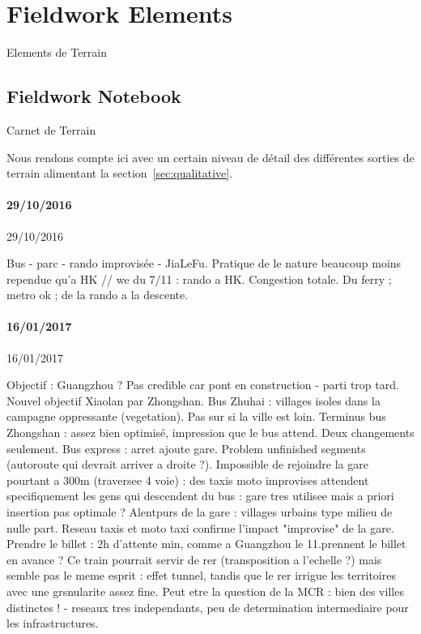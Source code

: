 




\section{Fieldwork Elements}{Elements de Terrain}

\label{app:sec:qualitative}


\subsection{Fieldwork Notebook}{Carnet de Terrain}

Nous rendons compte ici avec un certain niveau de détail des différentes sorties de terrain alimentant la section~\ref{sec:qualitative}.




\paragraph{29/10/2016}{29/10/2016}

Bus - parc - rando improvisée - JiaLeFu.
Pratique de le nature beaucoup moins rependue qu'a HK
// we du 7/11 : rando a HK. Congestion totale. Du ferry ; metro ok ; de la rando a la descente.



\paragraph{16/01/2017}{16/01/2017}

Objectif : Guangzhou ? Pas credible car pont en construction - parti trop tard. Nouvel objectif Xiaolan par Zhongshan. Bus Zhuhai : villages isoles dans la campagne oppressante (vegetation). Pas sur si la ville est loin. Terminus bus Zhongshan : assez bien optimisé, impression que le bus attend. Deux changements seulement. Bus express : arret ajoute gare. Problem unfinished segments (autoroute qui devrait arriver a droite ?). Impossible de rejoindre la gare pourtant a 300m (traversee 4 voie) : des taxis moto improvises attendent specifiquement les gens qui descendent du bus : gare tres utilisee mais a priori insertion pas optimale ? Alentpurs de la gare : villages urbains type milieu de nulle part. Reseau taxis et moto taxi confirme l'impact "improvise" de la gare. Prendre le billet : 2h d'attente min, comme a Guangzhou le 11.prennent le billet en avance ? Ce train pourrait servir de rer (transposition a l'echelle ?) mais semble pas le meme esprit : effet tunnel, tandis que le rer irrigue les territoires avec une grsnularite assez fine. Peut etre la question de la MCR : bien des villes distinctes ! - reseaux tres independants, peu de determination intermediaire pour les infrastructures.

